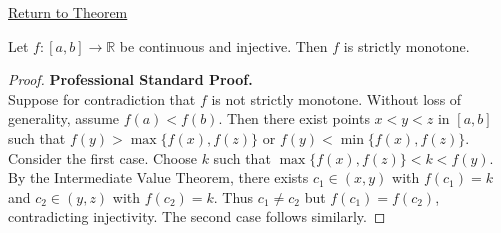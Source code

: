 \newpage
{}
\label{prf:cont-inj-monotone}

\begin{remark*}[Return]
\hyperref[thm:cont-inj-monotone]{Return to Theorem}
\end{remark*}

\begin{theorem*}
Let $f: [a,b] \to \mathbb{R}$ be continuous and injective. Then $f$ is strictly monotone.
\end{theorem*}

\begin{proof}
\textbf{Professional Standard Proof.}~\\
Suppose for contradiction that $f$ is not strictly monotone. Without loss of generality, assume $f(a) < f(b)$. Then there exist points $x < y < z$ in $[a,b]$ such that $f(y) > \max\{f(x), f(z)\}$ or $f(y) < \min\{f(x), f(z)\}$. Consider the first case. Choose $k$ such that $\max\{f(x), f(z)\} < k < f(y)$. By the Intermediate Value Theorem, there exists $c_1 \in (x, y)$ with $f(c_1) = k$ and $c_2 \in (y, z)$ with $f(c_2) = k$. Thus $c_1 \neq c_2$ but $f(c_1) = f(c_2)$, contradicting injectivity. The second case follows similarly.
\end{proof}

